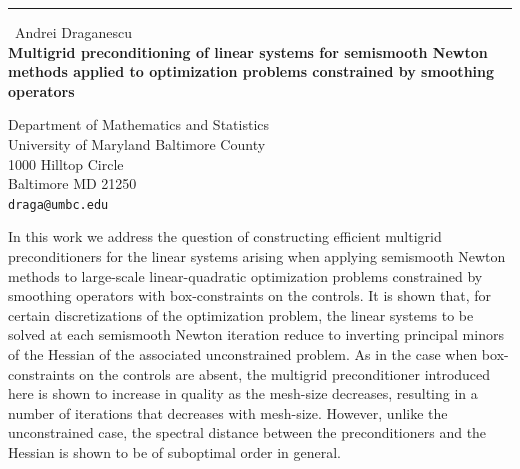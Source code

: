 \documentclass{report}
\begin{document}
\begin{center}
\rule{6in}{1pt} \
{\large Andrei Draganescu \\
{\bf Multigrid preconditioning of linear systems for semismooth Newton methods applied to optimization problems constrained by smoothing operators}}

Department of Mathematics and Statistics \\ University of Maryland Baltimore County \\ 1000 Hilltop Circle \\ Baltimore MD 21250
\\
{\tt draga@umbc.edu}\end{center}

In this work we address the question of constructing efficient multigrid
preconditioners for the linear systems arising when applying semismooth
Newton methods to large-scale linear-quadratic optimization problems
constrained by smoothing operators with box-constraints on the controls.
It is shown that, for certain discretizations of the optimization
problem, the linear systems to be solved at each semismooth Newton
iteration reduce to inverting principal minors of the Hessian of the
associated unconstrained problem. As in the case when box-constraints on
the controls are absent, the multigrid preconditioner introduced here is
shown to increase in quality as the mesh-size decreases, resulting in a
number of iterations that decreases with mesh-size. However, unlike the
unconstrained case, the spectral distance between the preconditioners and
the Hessian is shown to be of suboptimal order in general.
\end{document}
